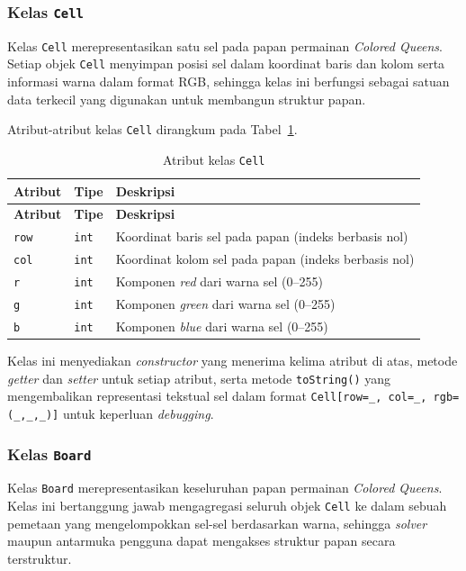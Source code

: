 \subsubsection{Kelas \texttt{Cell}}
\label{subsubsec:kelas-cell}

Kelas \texttt{Cell} merepresentasikan satu sel pada papan permainan \textit{Colored Queens}. Setiap objek \texttt{Cell} menyimpan posisi sel dalam koordinat baris dan kolom serta informasi warna dalam format RGB, sehingga kelas ini berfungsi sebagai satuan data terkecil yang digunakan untuk membangun struktur papan.

Atribut-atribut kelas \texttt{Cell} dirangkum pada Tabel~\ref{tab:attr-cell}.

\begin{longtable}{llp{7.5cm}}
	\caption{Atribut kelas \texttt{Cell}}
	\label{tab:attr-cell} \\
	\toprule
	\textbf{Atribut} & \textbf{Tipe} & \textbf{Deskripsi} \\
	\midrule
	\endfirsthead
	\toprule
	\textbf{Atribut} & \textbf{Tipe} & \textbf{Deskripsi} \\
	\midrule
	\endhead
	\bottomrule
	\endfoot
	\texttt{row} & \texttt{int} & Koordinat baris sel pada papan (indeks berbasis nol) \\
	\midrule
	\texttt{col} & \texttt{int} & Koordinat kolom sel pada papan (indeks berbasis nol) \\
	\midrule
	\texttt{r} & \texttt{int} & Komponen \textit{red} dari warna sel (0--255) \\
	\midrule
	\texttt{g} & \texttt{int} & Komponen \textit{green} dari warna sel (0--255) \\
	\midrule
	\texttt{b} & \texttt{int} & Komponen \textit{blue} dari warna sel (0--255) \\
	\bottomrule
\end{longtable}

Kelas ini menyediakan \textit{constructor} yang menerima kelima atribut di atas, metode \textit{getter} dan \textit{setter} untuk setiap atribut, serta metode \texttt{toString()} yang mengembalikan representasi tekstual sel dalam format \texttt{Cell[row=\_, col=\_, rgb=(\_,\_,\_)]} untuk keperluan \textit{debugging}.

\subsubsection{Kelas \texttt{Board}}
\label{subsubsec:kelas-board}

Kelas \texttt{Board} merepresentasikan keseluruhan papan permainan \textit{Colored Queens}. Kelas ini bertanggung jawab mengagregasi seluruh objek \texttt{Cell} ke dalam sebuah pemetaan yang mengelompokkan sel-sel berdasarkan warna, sehingga \textit{solver} maupun antarmuka pengguna dapat mengakses struktur papan secara terstruktur.

